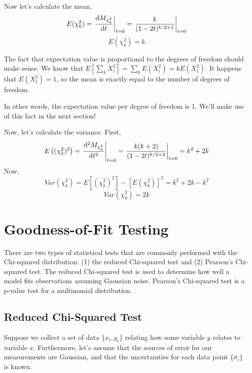 \documentclass[12pt]{article}
\numberwithin{equation}{section}
\theoremstyle{definition}
\begin{document}
Now let's calculate the mean,
\begin{equation}
		E(\chi_k^2) = \left.\dv{M_{\chi_k^2}}{t} \right|_{t=0} = \left.\frac{k}{(1-2t)^{k/2+1}}\right|_{t=0}
\end{equation}
\begin{equation}
		E(\chi_k^2) = k
		\label{eq:mean}
\end{equation}

The fact that expectation value is proportional to the degrees of freedom should make sense. We know that $E[\sum_k X_i^2] = \sum_k E(X_i^2) = k E(X_1^2)$. It happens that $ E(X_1^2) = 1$, so the mean is exactly equal to the number of degrees of freedom.

 In other words, the expectation value per degree of freedom is 1. We'll make use of this fact in the next section!

Now, let's calculate the variance. First,
\begin{equation}
		E\left((\chi_k^2)^2 \right) = \left.\dv[2]{M_{\chi_k^2}}{t} \right|_{t=0} =\left. \frac{k(k+2)}{(1-2t)^{k/2+2}}\right|_{t=0} = k^2+2k
\end{equation}
Now,
\begin{equation}
		Var(\chi_k^2) = 	E\left[(\chi_k^2)^2 \right]  - \left[E(\chi_k^2)\right]^2 = k^2+2k - k^2
\end{equation}
\begin{equation}
		Var(\chi_k^2) = 2k
		\label{eq:var}
\end{equation}

\section{Goodness-of-Fit Testing}

There are two types of statistical tests that are commonly performed with the Chi-squared distribution: (1) the reduced Chi-squared test and (2) Pearson's Chi-squared test. The reduced Chi-squared test is used to determine how well a model fits observations assuming Gaussian noise. Pearson's Chi-squared test is a p-value test for a multinomial distribution.

\subsection{Reduced Chi-Squared Test}

Suppose we collect a set of data $ \{x_i, y_i\} $ relating how some variable $y$ relates to variable $x$. Furthermore, let's assume that the sources of error for our measurements are Gaussian, and that the uncertainties for each data point $\{\sigma_i\} $ is known.
\end{document}
